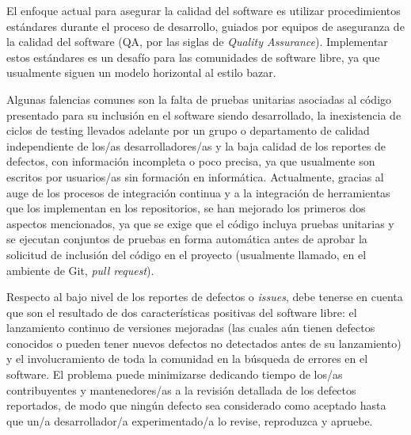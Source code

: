 El enfoque actual para asegurar la calidad del software es utilizar procedimientos estándares durante el proceso de desarrollo, guiados por equipos de aseguranza de la calidad del software (QA, por las siglas de \emph{Quality Assurance}). Implementar estos estándares es un desafío para las comunidades de software libre, ya que usualmente siguen un modelo horizontal al estilo bazar.

Algunas falencias comunes son la falta de pruebas unitarias asociadas al código presentado para su inclusión en el software siendo desarrollado, la inexistencia de ciclos de testing llevados adelante por un grupo o departamento de calidad independiente de los/as desarrolladores/as y la baja calidad de los reportes de defectos, con información incompleta o poco precisa, ya que usualmente son escritos por usuarios/as sin formación en informática. Actualmente, gracias al auge de los procesos de integración continua y a la integración de herramientas que los implementan en los repositorios, se han mejorado los primeros dos aspectos mencionados, ya que se exige que el código incluya pruebas unitarias y se ejecutan conjuntos de pruebas en forma automática antes de aprobar la solicitud de inclusión del código en el proyecto (usualmente llamado, en el ambiente de Git, \emph{pull request}). 

Respecto al bajo nivel de los reportes de defectos o \emph{issues}, debe tenerse en cuenta que son el resultado de dos características positivas del software libre: el lanzamiento continuo de versiones mejoradas (las cuales aún tienen defectos conocidos o pueden tener nuevos defectos no detectados antes de su lanzamiento) y el involucramiento de toda la comunidad en la búsqueda de errores en el software. El problema puede minimizarse dedicando tiempo de los/as contribuyentes y mantenedores/as a la revisión detallada de los defectos reportados, de modo que ningún defecto sea considerado como aceptado hasta que un/a desarrollador/a experimentado/a lo revise, reproduzca y apruebe.

